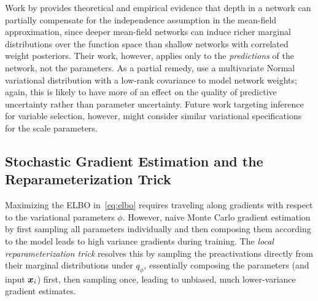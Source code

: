 Work by
\citet{farquhar_liberty_2021} provides theoretical and empirical
evidence that depth in a network can partially compensate for
the independence assumption in the mean-field approximation, since
deeper mean-field networks can induce richer marginal distributions
over the function space than shallow networks with correlated
weight posteriors.  Their work, however, applies only to the \textit{predictions} of the network, not the parameters.  As a partial remedy, \citet{ghosh_structured_2018} use a multivariate Normal variational distribution with a low-rank covariance to model network weights; again, this is likely to have more of an effect on the quality of predictive uncertainty rather than parameter uncertainty.  Future work targeting inference for variable selection, however, might consider similar variational specifications for the scale parameters.

\subsection{Stochastic Gradient Estimation and the
  Reparameterization Trick}
\label{subsec:ch3-reparam}

Maximizing the ELBO in~\eqref{eq:elbo} requires traveling along gradients with
respect to the variational parameters $\phi$.  However, naive Monte Carlo gradient estimation by first sampling all parameters individually and then composing them according to the model leads to high variance gradients during training.  The
\emph{local reparameterization trick}
\citep{kingma_variational_2015}
resolves this by sampling the preactivations directly from their marginal distributions under $q_\phi$, essentially composing the parameters (and input $\bm{x}_i$) first, then sampling once, leading to unbiased, much lower-variance gradient estimates.  




